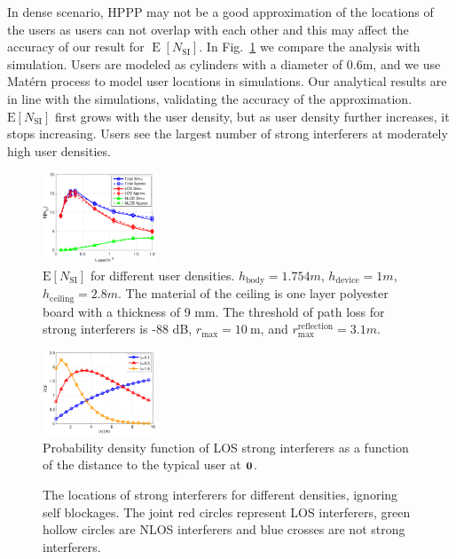 \documentclass[10pt, conference, letterpaper]{IEEEtran}
\newcommand*{\Rom}[1]{\uppercase\expandafter{\romannumeral #1\relax}} %
\DeclareMathOperator*{\E}{\mathrm{E}}
\begin{document}
In dense scenario, HPPP may not be a good approximation of the locations of the users as users can not overlap with each other and this may affect the accuracy of our result for $\E[N_{\mathrm{SI}}]$.
In Fig.~\ref{fig:channel:en_si} we compare the analysis with simulation.
Users are modeled as cylinders with a diameter of 0.6m, and we use Mat\'ern \Rom{3} process \cite{matern} to model user locations in simulations.
Our analytical results are in line with the simulations, validating the accuracy of the approximation. 
$\mathrm{E}[N_{\mathrm{SI}}]$ first grows with the user density, but as user density further increases, it stops increasing.
Users see the largest number of strong interferers at moderately high user densities. 


\begin{figure}
	\centering
	\includegraphics[width = 0.3\textwidth]{Channel_en_si.pdf}
	\caption{$\mathrm{E}[N_{\mathrm{SI}}]$ for different user densities. $h_{\mathrm{body}} = 1.754m$,  $h_{\mathrm{device}}= 1m$, $h_{\mathrm{ceiling}}=2.8m$. 
		The material of the ceiling is one layer polyester board with a thickness of 9 mm. 
		The threshold of path loss for strong interferers is -88 dB, $r_{\max} = 10\mathrm{~m}$, and $r_{\max}^{\mathrm{reflection}} = 3.1m$.}
	\label{fig:channel:en_si}
\end{figure}


\begin{figure}
	\centering
	\includegraphics[width = 0.3\textwidth]{Channel_si_pdf.pdf}
	\caption{Probability density function of LOS strong interferers as a function of the distance to the typical user at $\bf{0}$.}
	\label{fig:Channel_si_pdf}
\end{figure}

\begin{figure}[htp]	
	\centering
	 \hfill
	 \hfill
	\caption{The locations of strong interferers for different densities, ignoring self blockages. The joint red circles represent LOS interferers, green hollow circles are NLOS interferers and blue crosses are not strong interferers.}
	\label{fig:channel:jamming}
\end{figure}
\end{document}
